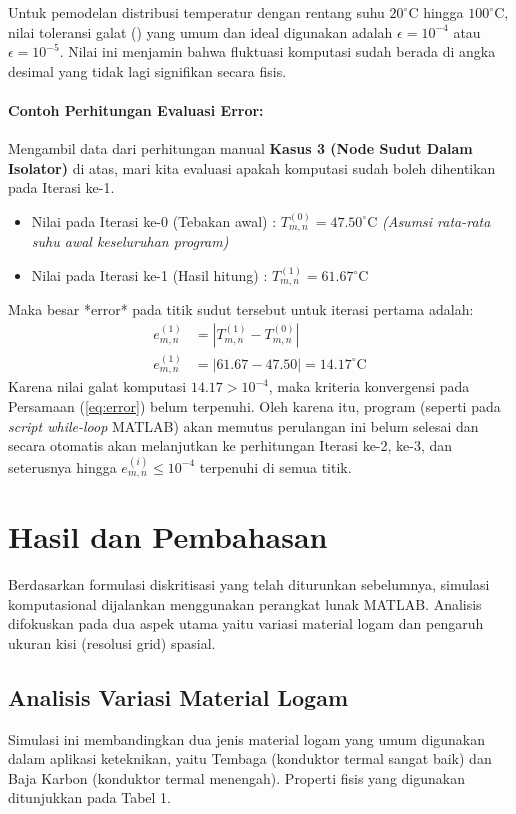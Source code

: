 \documentclass[12pt,a4paper]{article}
\begin{document}
Untuk pemodelan distribusi temperatur dengan rentang suhu $20^\circ\text{C}$ hingga $100^\circ\text{C}$, nilai toleransi galat () yang umum dan ideal digunakan adalah $\epsilon = 10^{-4}$ atau $\epsilon = 10^{-5}$. Nilai ini menjamin bahwa fluktuasi komputasi sudah berada di angka desimal yang tidak lagi signifikan secara fisis.

\paragraph{Contoh Perhitungan Evaluasi Error:}
Mengambil data dari perhitungan manual \textbf{Kasus 3 (Node Sudut Dalam Isolator)} di atas, mari kita evaluasi apakah komputasi sudah boleh dihentikan pada Iterasi ke-1.
\begin{itemize}
    \item Nilai pada Iterasi ke-0 (Tebakan awal) : $T_{m,n}^{(0)} = 47.50^\circ\text{C}$ \textit{(Asumsi rata-rata suhu awal keseluruhan program)}
    \item Nilai pada Iterasi ke-1 (Hasil hitung) : $T_{m,n}^{(1)} = 61.67^\circ\text{C}$
\end{itemize}
Maka besar *error* pada titik sudut tersebut untuk iterasi pertama adalah:
\begin{align*}
    e_{m,n}^{(1)} &= \left| T_{m,n}^{(1)} - T_{m,n}^{(0)} \right| \\
    e_{m,n}^{(1)} &= \left| 61.67 - 47.50 \right| = 14.17^\circ\text{C}
\end{align*}
Karena nilai galat komputasi $14.17 > 10^{-4}$, maka kriteria konvergensi pada Persamaan (\ref{eq:error}) belum terpenuhi. Oleh karena itu, program (seperti pada \textit{script while-loop} MATLAB) akan memutus perulangan ini belum selesai dan secara otomatis akan melanjutkan ke perhitungan Iterasi ke-2, ke-3, dan seterusnya hingga $e_{m,n}^{(i)} \leq 10^{-4}$ terpenuhi di semua titik.

\section{Hasil dan Pembahasan}
Berdasarkan formulasi diskritisasi yang telah diturunkan sebelumnya, simulasi komputasional dijalankan menggunakan perangkat lunak MATLAB. Analisis difokuskan pada dua aspek utama yaitu variasi material logam dan pengaruh ukuran kisi (resolusi grid) spasial.

\subsection{Analisis Variasi Material Logam}
Simulasi ini membandingkan dua jenis material logam yang umum digunakan dalam aplikasi keteknikan, yaitu Tembaga (konduktor termal sangat baik) dan Baja Karbon (konduktor termal menengah). Properti fisis yang digunakan ditunjukkan pada Tabel 1.
\end{document}
